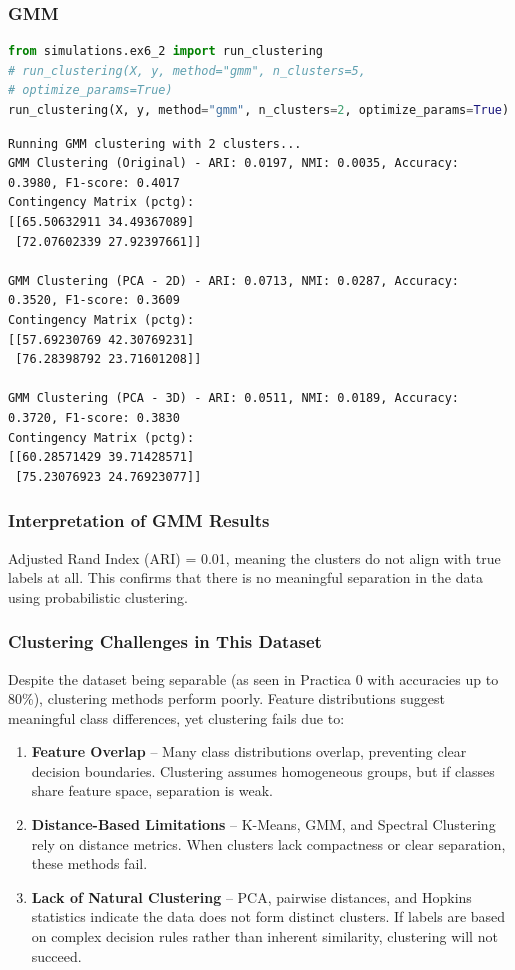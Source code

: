\documentclass[11pt,a4paper]{article}
\begin{document}
\subsubsection{GMM}

\begin{lstlisting}[language=Python]
from simulations.ex6_2 import run_clustering
# run_clustering(X, y, method="gmm", n_clusters=5, 
# optimize_params=True)
run_clustering(X, y, method="gmm", n_clusters=2, optimize_params=True)
\end{lstlisting}

\begin{verbatim}
Running GMM clustering with 2 clusters...
GMM Clustering (Original) - ARI: 0.0197, NMI: 0.0035, Accuracy: 0.3980, F1-score: 0.4017
Contingency Matrix (pctg):
[[65.50632911 34.49367089]
 [72.07602339 27.92397661]]

GMM Clustering (PCA - 2D) - ARI: 0.0713, NMI: 0.0287, Accuracy: 0.3520, F1-score: 0.3609
Contingency Matrix (pctg):
[[57.69230769 42.30769231]
 [76.28398792 23.71601208]]

GMM Clustering (PCA - 3D) - ARI: 0.0511, NMI: 0.0189, Accuracy: 0.3720, F1-score: 0.3830
Contingency Matrix (pctg):
[[60.28571429 39.71428571]
 [75.23076923 24.76923077]]
\end{verbatim}

\subsubsection{Interpretation of GMM Results}
Adjusted Rand Index (ARI) = 0.01, meaning the clusters do not align with true labels at all. This confirms that there is no meaningful separation in the data using probabilistic clustering.

\subsubsection{Clustering Challenges in This Dataset}
Despite the dataset being separable (as seen in Practica 0 with accuracies up to 80\%), clustering methods perform poorly. Feature distributions suggest meaningful class differences, yet clustering fails due to:
\begin{enumerate}
    \item \textbf{Feature Overlap} -- Many class distributions overlap, preventing clear decision boundaries. Clustering assumes homogeneous groups, but if classes share feature space, separation is weak.
    \item \textbf{Distance-Based Limitations} -- K-Means, GMM, and Spectral Clustering rely on distance metrics. When clusters lack compactness or clear separation, these methods fail.
    \item \textbf{Lack of Natural Clustering} -- PCA, pairwise distances, and Hopkins statistics indicate the data does not form distinct clusters. If labels are based on complex decision rules rather than inherent similarity, clustering will not succeed.
\end{enumerate}
\end{document}

